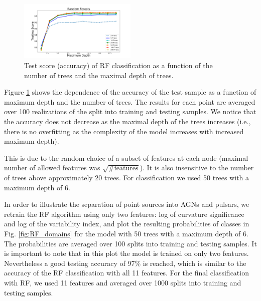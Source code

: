 \documentclass[referee]{aa} %
\begin{document}
\begin{figure}[h]
\centering
\includegraphics[width=0.5\textwidth]{plots/rf_train_assocnewfeats.pdf}
\caption{
Test score (accuracy) of RF classification as a function of the number of trees and 
the maximal depth of trees.
}
\label{fig:RF_complexity}
\end{figure}

Figure \ref{fig:RF_complexity} shows the dependence of the accuracy of the test sample as a function of maximum depth and the number of trees. 
The results for each point are averaged over 100 realizations of the split into training and testing samples.
We notice that the accuracy does not decrease as the maximal depth of the trees increases (i.e., there is no overfitting as the complexity of the model increases with increased maximum depth).


This is due to the random choice of a subset of features at each node (maximal number of allowed features was $\sqrt{\text{\# features}}$).
It is also insensitive to the number of trees above approximately 20 trees.
For classification we used 50 trees with a maximum depth of 6.


In order to illustrate the separation of point sources into AGNs and pulsars, we retrain the RF algorithm using only two features: log of curvature significance and log of the variability index, and plot the resulting probabilities of classes in Fig. \ref{fig:RF_domains}
for the model with 50 trees with a maximum depth of 6.
The probabilities are averaged over 100 splits into training and testing samples.
It is important to note that in this plot the model is trained on only two features. Nevertheless a good testing accuracy of 97\% is reached, 
which is similar to the accuracy of the RF classification with all 11 features.
For the final classification with RF, we used 11 features and averaged over 1000 splits into training and testing samples.
\end{document}
